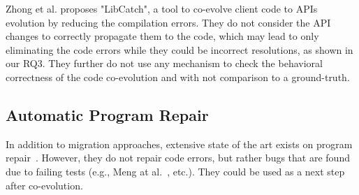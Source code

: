  
 Zhong et al. \cite{10.1145/3597503.3639084} proposes "LibCatch", a tool to co-evolve client code to APIs evolution by reducing the compilation errors. They do not consider the API changes to correctly propagate them to the code, which may lead to only eliminating the code errors while they could be incorrect resolutions, as shown in our RQ3. They further do not use any mechanism to check the behavioral correctness of the code co-evolution and with not comparison to a ground-truth.
 
 
 
 
 
 
 
 \subsection{Automatic Program Repair}
 \label{APR}
 
 In addition to migration approaches, extensive state of the art exists on program repair~\cite{goues2019automated,liu2020efficiency,monperrus2018automatic,gazzola2017automatic}. However, they do not repair code errors, but rather bugs that are found due to failing tests (e.g., Meng at al.~\cite{10.5555/2486788.2486855}, etc.). They could be used as a next step after co-evolution. 
 
